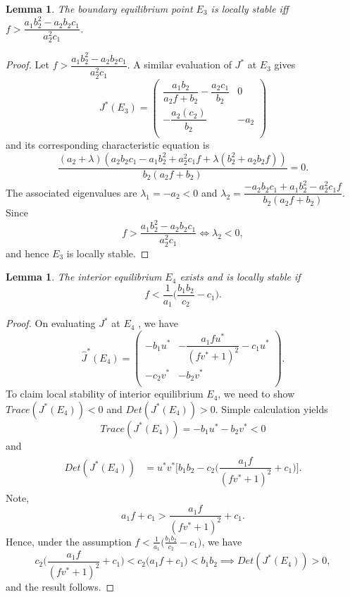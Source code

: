 \documentclass[10pt]{amsart}
\newtheorem{lemma}[theorem]{Lemma}
\theoremstyle{definition}
\begin{document}
\begin{lemma}\label{3eq3}
	The boundary equilibrium point $E_3$ is locally stable iff $f>\dfrac{a_1 b_2^2 - a_2 b_2 c_1}{a_2^2 c_1}$.
\end{lemma}

\begin{proof}
	Let $f>\dfrac{a_1 b_2^2 - a_2 b_2 c_1}{a_2^2 c_1}$. A similar evaluation of $J^*$ at $E_3$ gives
	\begin{equation}
		J^*(E_3)=
		\left(
		\begin{array}{cc}
			\dfrac{a_1 b_2}{a_2 f+b_2}-\dfrac{a_2 c_1}{b_2} & 0 \\
			-\dfrac{a_2 \left(c_2\right)}{b_2} & -a_2 \\
		\end{array}
		\right)
	\end{equation}
	and its corresponding characteristic equation is
	\[\dfrac{\left(a_2+\lambda \right) \left(a_2 b_2 c_1-a_1 b_2^2+a_2^2 c_1 f+\lambda (b_2^2  +a_2 b_2 f) \right)}{b_2 \left(a_2 f+b_2\right)}=0.\]
	The associated eigenvalues are $\lambda_1=-a_2<0$ and $\lambda_2=\dfrac{-a_2 b_2 c_1+a_1 b_2^2-a_2^2 c_1 f}{b_2 \left(a_2 f+b_2\right)}$. Since 
	\[f>\dfrac{a_1 b_2^2 - a_2 b_2 c_1}{a_2^2 c_1} \iff \lambda_2<0,\]
	and hence $E_3$ is locally stable.
\end{proof}


\begin{lemma}\label{3eq4}
	The interior equilibrium $E_4$ exists and is locally stable  if  
	\[ f < \frac{1}{a_1} \Big( \frac{b_1b_2}{c_2} - c_1 \Big).\]
\end{lemma}

\begin{proof}
	On evaluating  $J^*$ at $E_4$ , we have
	\begin{equation*}
		\widehat{J}^*(E_4)=
		\left(
		\begin{array}{cc}
			-b_1 u^* & -\dfrac{a_1 f u^*}{(f v^* +1)^2} - c_1 u^* \\
			-c_2 v^*&  -b_2 v^*\\
			
		\end{array}
		\right).
	\end{equation*}
	To claim local stability of interior equilibrium $E_4$, we need to show $Trace(J^*(E_4))<0$ and $Det(J^*(E_4))>0$. Simple calculation yields
	\[ Trace(J^*(E_4)) =  -b_1 u^* -b_2 v^*<0\]
	and 
	\begin{align*}
		\begin{split}
			Det(J^*(E_4)) &= u^* v^* \Big[b_1 b_2 - c_2 \Big( \dfrac{a_1 f}{(f v^* +1)^2} + c_1 \Big)\Big].
		\end{split}
	\end{align*}
	Note,
	\[ a_1 f + c_1 > \dfrac{a_1 f}{(f v^* +1)^2} + c_1.\]
	Hence, under the assumption $f < \frac{1}{a_1} \Big( \frac{b_1b_2}{c_2} - c_1 \Big)$, we have
	\[ c_2 \Big( \dfrac{a_1 f}{(f v^* +1)^2} + c_1 \Big) < c_2 \Big( a_1 f + c_1 \Big) < b_1 b_2 \implies Det(J^*(E_4))>0,\]
	and the result follows.
\end{proof}
\end{document}

